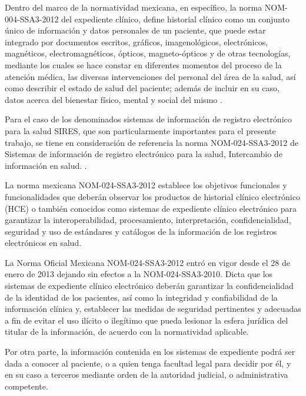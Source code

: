 Dentro del marco de la normatividad mexicana, en específico, la norma NOM-004-SSA3-2012 del expediente clínico, define historial clínico como un conjunto único de información y datos personales de un paciente, que puede estar integrado por documentos escritos, gráficos, imagenológicos, electrónicos, magnéticos, electromagnéticos, ópticos, magneto-ópticos y de otras tecnologías, mediante los cuales se hace constar en diferentes momentos del proceso de la atención médica, las diversas intervenciones del personal del área de la salud, así como describir el estado de salud del paciente; además de incluir en su caso, datos acerca del bienestar físico, mental y social del mismo \cite{A04}.

\vspace{1em}

Para el caso de los denominados sistemas de información de registro electrónico para la salud SIRES, que son particularmente importantes para el presente trabajo, se tiene en consideración de referencia la norma NOM-024-SSA3-2012 de Sistemas de información de registro electrónico para la salud, Intercambio de información en salud. \cite{A05}.

\vspace{1em}

La norma mexicana NOM-024-SSA3-2012 establece los objetivos funcionales y funcionalidades que deberán observar los productos de historial clínico electrónico (HCE) o también conocidos como sistemas de expediente clínico electrónico para garantizar la interoperabilidad, procesamiento, interpretación, confidencialidad, seguridad y uso de estándares y catálogos de la información de los registros electrónicos en salud.

\vspace{1em}

La Norma Oficial Mexicana NOM-024-SSA3-2012 entró en vigor desde el 28 de enero de 2013 dejando sin efectos a la NOM-024-SSA3-2010. Dicta que los sistemas de expediente clínico electrónico deberán garantizar la confidencialidad de la identidad de los pacientes, así como la integridad y confiabilidad de la información clínica y, establecer las medidas de seguridad pertinentes y adecuadas a fin de evitar el uso ilícito o ilegítimo que pueda lesionar la esfera jurídica del titular de la información, de acuerdo con la normatividad aplicable.

\vspace{1em}

Por otra parte, la información contenida en los sistemas de expediente podrá ser dada a conocer al paciente, o a quien tenga facultad legal para decidir por él, y en su caso a terceros mediante orden de la autoridad judicial, o administrativa competente.

